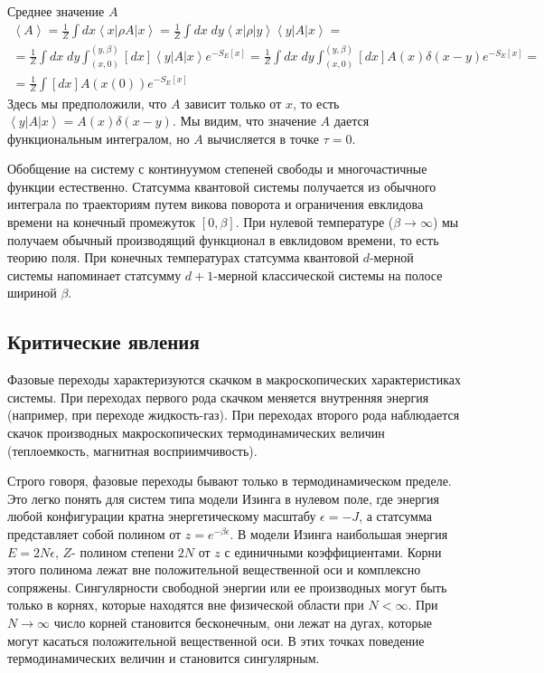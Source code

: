 \documentclass[a4paper,12pt]{article}
\theoremstyle{definition}
\theoremstyle{definition}
\theoremstyle{definition}
\begin{document}
Среднее значение $A$
\begin{equation}
  \label{eq:26}
  \begin{array}{l}
    \left<A\right>=\frac{1}{Z}\int dx \left<x\right|\rho A\left|x\right>=\frac{1}{Z}\int dx\; dy \left<x\right|\rho\left|y\right>\left<y\right|A\left|x\right>=    \\
    =\frac{1}{Z}\int dx\; dy \int_{(x,0)}^{(y,\beta)} [dx] \left<y\right| A\left| x\right> e^{-S_E[x]}=\frac{1}{Z}\int dx\; dy\int_{(x,0)}^{(y,\beta)} [dx] A(x) \delta(x-y) e^{-S_E[x]}=\\
    =\frac{1}{Z}\int [dx] A(x(0))e^{-S_E[x]}
  \end{array}
\end{equation}
Здесь мы предположили, что $A$ зависит только от $x$, то есть $\left<y\right| A\left|x\right>=A(x)\delta(x-y)$. Мы видим, что значение $A$ дается функциональным интегралом, но $A$ вычисляется в точке $\tau=0$. 

Обобщение на систему с континуумом степеней свободы и многочастичные функции естественно. Статсумма квантовой системы получается из обычного интеграла по траекториям путем викова поворота и ограничения евклидова времени на конечный промежуток $[0,\beta]$. При нулевой температуре ($\beta\to \infty$) мы получаем обычный производящий функционал в евклидовом времени, то есть теорию поля. При конечных температурах статсумма квантовой $d$-мерной системы напоминает статсумму $d+1$-мерной классической системы на полосе шириной $\beta$.

\subsection{Критические явления}
\label{sec:critical-phenomena}

Фазовые переходы характеризуются скачком в макроскопических характеристиках системы. При переходах первого рода скачком меняется внутренняя энергия (например, при переходе жидкость-газ). При переходах второго рода наблюдается скачок производных макроскопических термодинамических величин (теплоемкость, магнитная восприимчивость). 

Строго говоря, фазовые переходы бывают только в термодинамическом пределе. Это легко понять для систем типа модели Изинга в нулевом поле, где энергия любой конфигурации кратна энергетическому масштабу $\epsilon=-J$, а статсумма представляет собой полином от $z=e^{-\beta\epsilon}$. В модели Изинга наибольшая энергия $E=2N\epsilon$, $Z$- полином степени $2N$ от $z$ с единичными коэффициентами. Корни этого полинома лежат вне положительной вещественной оси и комплексно сопряжены. Сингулярности свободной энергии или ее производных могут быть только в корнях, которые находятся вне физической области при $N<\infty$. При $N\to \infty$ число корней становится бесконечным, они лежат на дугах, которые могут касаться положительной вещественной оси. В этих точках поведение термодинамических величин и становится сингулярным.
\end{document}
